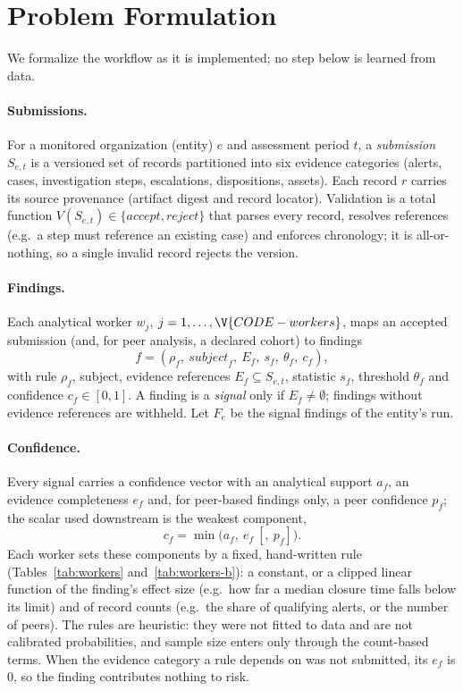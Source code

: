 \section{Problem Formulation}
\label{sec:formulation}

We formalize the workflow as it is implemented; no step below is learned from data.

\paragraph{Submissions.} For a monitored organization (entity) $e$ and assessment
period $t$, a \emph{submission} $S_{e,t}$ is a versioned set of records partitioned
into six evidence categories (alerts, cases, investigation steps, escalations,
dispositions, assets). Each record $r$ carries its source provenance (artifact digest
and record locator). Validation is a total function
$V(S_{e,t})\in\{\mathit{accept},\mathit{reject}\}$ that parses every record, resolves
references (e.g.\ a step must reference an existing case) and enforces chronology; it
is all-or-nothing, so a single invalid record rejects the version.

\paragraph{Findings.} Each analytical worker $w_j$, $j=1,\dots,\V{CODE-workers}$, maps
an accepted submission (and, for peer analysis, a declared cohort) to findings
\begin{equation}
f=(\rho_f,\ \mathit{subject}_f,\ E_f,\ s_f,\ \theta_f,\ c_f),
\end{equation}
with rule $\rho_f$, subject, evidence references $E_f\subseteq S_{e,t}$, statistic $s_f$,
threshold $\theta_f$ and confidence $c_f\in[0,1]$. A finding is a \emph{signal} only if
$E_f\neq\emptyset$; findings without evidence references are withheld. Let $F_e$ be the
signal findings of the entity's run.

\paragraph{Confidence.} Every signal carries a confidence vector with an analytical
support $a_f$, an evidence completeness $e_f$ and, for peer-based findings only, a peer
confidence $p_f$; the scalar used downstream is the weakest component,
\begin{equation}
c_f=\min\bigl(a_f,\ e_f\ [,\ p_f]\bigr).
\label{eq:confidence}
\end{equation}
Each worker sets these components by a fixed, hand-written rule
(Tables~\ref{tab:workers} and~\ref{tab:workers-b}): a constant, or a clipped linear function of the finding's
effect size (e.g.\ how far a median closure time falls below its limit) and of record
counts (e.g.\ the share of qualifying alerts, or the number of peers). The rules are
heuristic: they were not fitted to data and are not calibrated probabilities, and
sample size enters only through the count-based terms. When the evidence category a
rule depends on was not submitted, its $e_f$ is $0$, so the finding contributes nothing
to risk.

